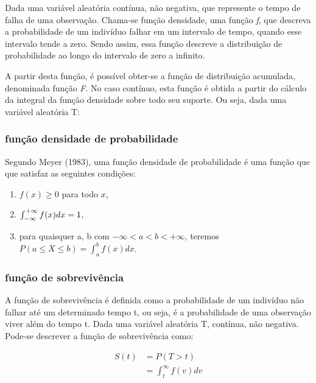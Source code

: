 \documentclass[12pt,a4paper]{article}
\begin{document}
Dada uma variável aleatória contínua, não negativa, que represente o tempo de falha de uma observação. Chama-se função densidade, uma função \textit{f}, que descreva a probabilidade de um indivíduo falhar em um intervalo de tempo, quando esse intervalo tende a zero. Sendo assim, essa função descreve a distribuição de probabilidade ao longo do intervalo de zero a infinito.

A partir desta função, é possível obter-se a função de distribuição acumulada, denominada função \textit{F}. No caso contínuo, esta função é obtida a partir do cálculo da integral da função densidade sobre todo seu suporte. Ou seja, dada uma variável aleatória T:

\subsubsection{função densidade de probabilidade}

Segundo Meyer (1983), uma função densidade de probabilidade é uma função que que satisfaz as seguintes condições:%

\begin{enumerate}[i]

	\item $f(x) \ge 0$ para todo $x$,
	\item $\int_{\tiny{-\infty}}^{\tiny{+\infty}} f(x)dx = 1$,
	\item para quaisquer a, b com $-\infty < a < b < +\infty$, teremos $P(a \le X \le b) = \int_a^b f(x)dx$.
\end{enumerate}
	 
		
\subsubsection{função de sobrevivência}

A função de sobrevivência é definida como a probabilidade de um indivíduo não falhar até um determinado tempo t, ou seja, é a probabilidade de uma observação viver além do tempo t. Dada uma variável aleatória T, contínua, não negativa. Pode-se descrever a função de sobrevivência como:

\begin{equation} \label{eq:1}
	\begin{split}
		S(t) & = P(T > t) \\
		& = \int_t^{\infty} f(v)dv 
  	\end{split}
\end{equation} 
\end{document}
